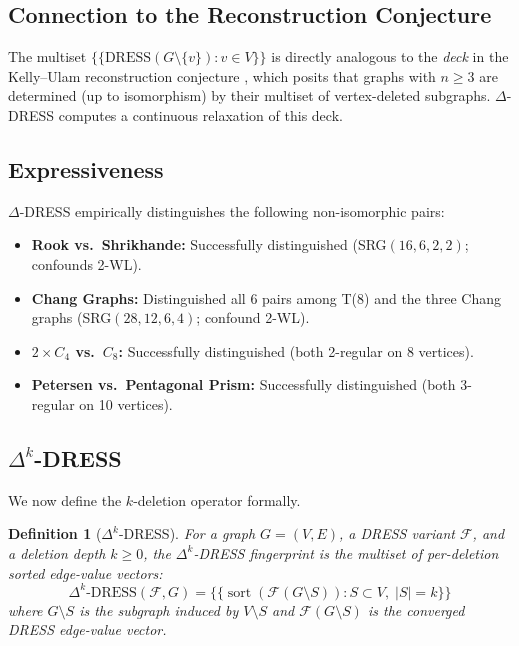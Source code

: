 \documentclass[11pt,a4paper]{article}
\newtheorem{definition}[theorem]{Definition}
\begin{document}
\subsection{Connection to the Reconstruction Conjecture}
The multiset $\{\!\{ \text{DRESS}(G \setminus \{v\}) : v \in V \}\!\}$ is directly analogous to the \textit{deck} in the Kelly--Ulam reconstruction conjecture \cite{kelly1942congruence, ulam1960collection}, which posits that graphs with $n \ge 3$ are determined (up to isomorphism) by their multiset of vertex-deleted subgraphs. $\Delta$-DRESS computes a continuous relaxation of this deck.

\subsection{Expressiveness}
$\Delta$-DRESS empirically distinguishes the following non-isomorphic pairs:
\begin{itemize}
    \item \textbf{Rook vs.\ Shrikhande:} Successfully distinguished (SRG$(16,6,2,2)$; confounds 2-WL).
    \item \textbf{Chang Graphs:} Distinguished all 6 pairs among T(8) and the three Chang graphs (SRG$(28,12,6,4)$; confound 2-WL).
    \item \textbf{$2 \times C_4$ vs.\ $C_8$:} Successfully distinguished (both 2-regular on 8 vertices).
    \item \textbf{Petersen vs.\ Pentagonal Prism:} Successfully distinguished (both 3-regular on 10 vertices).
\end{itemize}

\subsection{$\Delta^k$-DRESS}

We now define the $k$-deletion operator formally.

\begin{definition}[$\Delta^k$-DRESS]
\label{def:delta-k}
For a graph $G = (V, E)$, a DRESS variant $\mathcal{F}$, and a deletion depth $k \ge 0$, the $\Delta^k$-DRESS fingerprint is the multiset of per-deletion sorted edge-value vectors:
\[
\Delta^k\text{-DRESS}(\mathcal{F}, G) = \{\!\{ \operatorname{sort}(\mathcal{F}(G \setminus S)) : S \subset V,\; |S| = k \}\!\}
\]
where $G \setminus S$ is the subgraph induced by $V \setminus S$ and $\mathcal{F}(G \setminus S)$ is the converged DRESS edge-value vector.
\end{definition}
\end{document}
